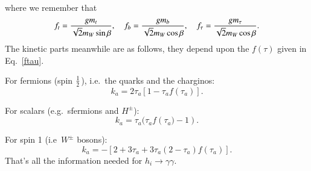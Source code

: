 \documentclass[final,3p,times,pdflatex]{elsarticle}
\begin{document}
where we remember that
\begin{equation}
f_{t} = {g m_{t} \over \sqrt{2} m_{W} \sin\beta}, \quad \quad \\
f_{b} = {g m_{b} \over \sqrt{2} m_{W} \cos\beta}, \quad \quad \\
f_{\tau} = {g m_{\tau} \over \sqrt{2} m_{W} \cos\beta}. \\
\end{equation}
The kinetic parts meanwhile are as follows, they depend upon the $f({\tau})$ given in Eq.~\eqref{ftau}.

For fermions (spin ${1 \over 2}$), i.e.\ the quarks and the charginos:
\begin{equation}
k_{a} = 2 \tau_{a} [1-\tau_{a} f({\tau_{a}})].
\end{equation}

For scalars (e.g.\ sfermions and $H^{\pm}$):
\begin{equation}
k_{a} = \tau_{a} (\tau_{a} f({\tau_{a}) - 1}).
\end{equation}

For spin 1 (i.e\ $W^\pm$ bosons):
\begin{equation}
k_{a} = -[2 + 3\tau_{a} + 3\tau_{a}(2-\tau_{a})f({\tau_{a}})].
\end{equation}
That's all the information needed for $h_{i} \rightarrow \gamma \gamma$.
\end{document}
